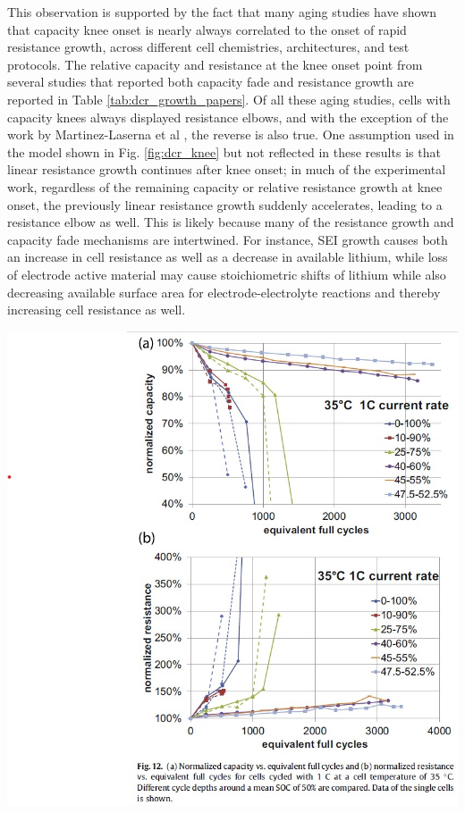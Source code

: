 \documentclass[journal=jpcl, manuscript=article, layout=onecolumn]{achemso}
\begin{document}
This observation is supported by the fact that many aging studies have shown that capacity knee onset is nearly always correlated to the onset of rapid resistance growth, across different cell chemistries, architectures, and test protocols. The relative capacity and resistance at the knee onset point from several studies that reported both capacity fade and resistance growth are reported in Table \ref{tab:dcr_growth_papers}. Of all these aging studies, cells with capacity knees always displayed resistance elbows, and with the exception of the work by Martinez-Laserna et al \cite{martinez-laserna_technical_2018}, the reverse is also true. One assumption used in the model shown in Fig. \ref{fig:dcr_knee} but not reflected in these results is that linear resistance growth continues after knee onset; in much of the experimental work, regardless of the remaining capacity or relative resistance growth at knee onset, the previously linear resistance growth suddenly accelerates, leading to a resistance elbow as well. This is likely because many of the resistance growth and capacity fade mechanisms are intertwined. For instance, SEI growth causes both an increase in cell resistance as well as a decrease in available lithium, while loss of electrode active material may cause stoichiometric shifts of lithium while also decreasing available surface area for electrode-electrolyte reactions and thereby increasing cell resistance as well.

\hfil\includegraphics[scale=0.5]{images/Ecker_2014_fig12.jpg}
\end{document}
